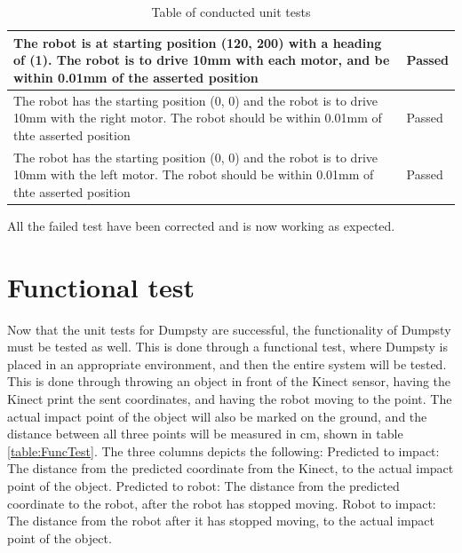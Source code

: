 \begin{table}[H]
\begin{center}
\begin{tabular}{ | p{10cm} | p{5cm} |}
			The robot is at starting position (120, 200) with a heading of (1). The robot is to drive 10mm with each motor, and be within 0.01mm of the asserted position & Passed \\ \hline
			The robot has the starting position (0, 0) and the robot is to drive 10mm with the right motor. The robot should be within 0.01mm of thte asserted position & Passed \\ \hline
			The robot has the starting position (0, 0) and the robot is to drive 10mm with the left motor. The robot should be within 0.01mm of thte asserted position & Passed \\ \hline
		\end{tabular}
		\caption{Table of conducted unit tests}
		\label{table:Unit tests}
	\end{center}
\end{table}


All the failed test have been corrected and is now working as expected. 


\section{Functional test}
\label{sec:LasseSucks}
Now that the unit tests for Dumpsty are successful, the functionality of Dumpsty must be tested as well. This is done through a functional test, where Dumpsty is placed in an appropriate environment, and then the entire system will be tested. This is done through throwing an object in front of the Kinect sensor, having the Kinect print the sent coordinates, and having the robot moving to the point. The actual impact point of the object will also be marked on the ground, and the distance between all three points will be measured in cm, shown in table \ref{table:FuncTest}. \newline
The three columns depicts the following:\newline
Predicted to impact: The distance from the predicted coordinate from the Kinect, to the actual impact point of the object.\newline
Predicted to robot: The distance from the predicted coordinate to the robot, after the robot has stopped moving.\newline
Robot to impact: The distance from the robot after it has stopped moving, to the actual impact point of the object.


